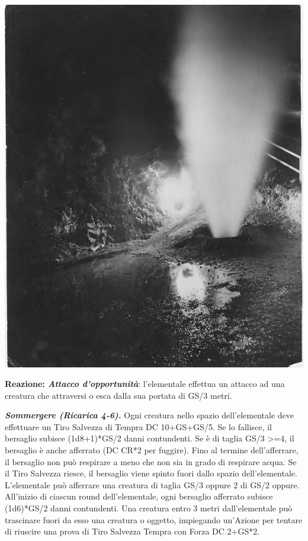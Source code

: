 \begin{multicols}{2}
{\begin{center}
	\includegraphics[width=0.9\linewidth]{immagini/geyser.png}
\end{center}

\textbf{Reazione: \emph{Attacco d'opportunità}}: l'elementale effettua un attacco ad una creatura che attraversi o esca dalla sua portata di GS/3 metri.

\emph{\textbf{Sommergere (Ricarica 4-6).}} Ogni creatura nello spazio dell'elementale deve effettuare un Tiro Salvezza di Tempra DC 10+GS+GS/5. Se lo fallisce, il bersaglio subisce (1d8+1)*GS/2 danni contundenti. Se è di taglia GS/3 >=4, il bersaglio è anche afferrato (DC CR*2 per fuggire). Fino al termine dell'afferrare, il bersaglio non può respirare a meno che non sia in grado di respirare acqua. Se il Tiro Salvezza riesce, il bersaglio viene spinto fuori dallo spazio dell'elementale.\\
L'elementale può afferrare una creatura di taglia GS/3 oppure 2 di GS/2 oppure. All'inizio di ciascun round dell'elementale, ogni bersaglio afferrato subisce (1d6)*GS/2 danni contundenti. Una creatura entro 3 metri dall'elementale può trascinare fuori da esso una creatura o oggetto, impiegando un'Azione per tentare di riuscire una prova di Tiro Salvezza Tempra con Forza DC 2+GS*2.\\

}
\end{multicols}
